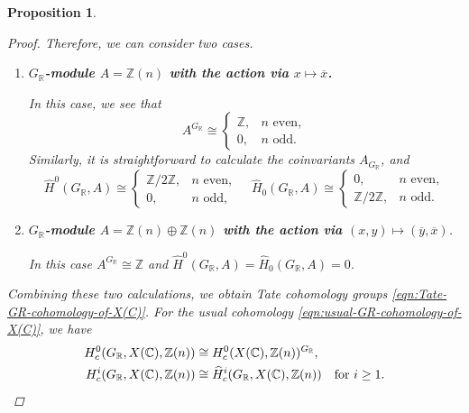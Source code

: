 \documentclass{article}
\newcommand{\CC}{\mathbb{C}}
\newcommand{\RR}{\mathbb{R}}
\newcommand{\ZZ}{\mathbb{Z}}
\theoremstyle{myplain}
\newtheorem{proposition}[theorem]{Proposition}
\theoremstyle{mydefinition}
\begin{document}
\begin{proposition}
\begin{proof}
    \vspace{1em}

    Therefore, we can consider two cases.
    \begin{enumerate}
    \item[1)] \textbf{$G_\RR$-module $A = \ZZ (n)$ with the action via
        $x \mapsto \overline{x}$.}

      In this case, we see that
      \[ A^{G_\RR} \cong
        \begin{cases}
          \ZZ, & n\text{ even}, \\
          0, & n\text{ odd}.
        \end{cases} \]
      Similarly, it is straightforward to calculate the coinvariants
      $A_{G_\RR}$, and
      \[ \widehat{H}^0 (G_\RR, A) \cong
        \begin{cases}
          \ZZ/2\ZZ, & n\text{ even},\\
          0, & n\text{ odd},
        \end{cases} \quad
        \widehat{H}_0 (G_\RR, A) \cong
        \begin{cases}
          0, & n\text{ even},\\
          \ZZ/2\ZZ, & n\text{ odd}.
        \end{cases} \]

    \item[2)] \textbf{$G_\RR$-module $A = \ZZ (n) \oplus \ZZ (n)$ with the
        action via $(x,y) \mapsto (\overline{y}, \overline{x})$}.

      In this case $A^{G_\RR} \cong \ZZ$ and
      $\widehat{H}^0 (G_\RR,A) = \widehat{H}_0 (G_\RR,A) = 0$.
    \end{enumerate}

    Combining these two calculations, we obtain Tate cohomology groups
    \eqref{eqn:Tate-GR-cohomology-of-X(C)}. For the usual cohomology
    \eqref{eqn:usual-GR-cohomology-of-X(C)}, we have
    \begin{align*}
      H^0_c (G_\RR, X(\CC), \ZZ (n)) & \cong H^0_c (X(\CC), \ZZ (n))^{G_\RR}, \\
      H^i_c (G_\RR, X(\CC), \ZZ (n)) & \cong \widehat{H}^i_c (G_\RR, X(\CC), \ZZ (n)) \quad \text{for }i \ge 1. \qedhere
    \end{align*}
  \end{proof}
\end{proposition}

\end{document}
